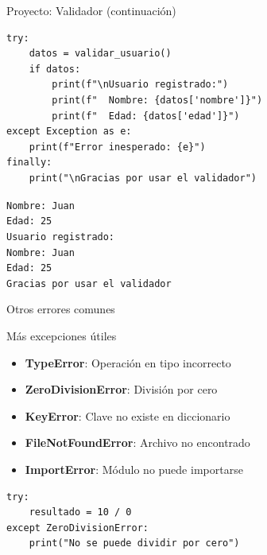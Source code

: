 \documentclass{beamer}
\begin{document}
\begin{frame}[fragile]{Proyecto: Validador (continuación) \faUserCog}
\begin{lstlisting}
try:
    datos = validar_usuario()
    if datos:
        print(f"\nUsuario registrado:")
        print(f"  Nombre: {datos['nombre']}")
        print(f"  Edad: {datos['edad']}")
except Exception as e:
    print(f"Error inesperado: {e}")
finally:
    print("\nGracias por usar el validador")
\end{lstlisting}

\vspace{-0.2cm}
\begin{tcolorbox}[colback=green!10,colframe=green,title={\small\faArrowCircleRight \ Ejemplo de salida},coltitle=fg0,left=3pt,right=3pt,top=2pt,bottom=2pt,boxsep=1pt]
\small\texttt{Nombre: Juan\\
Edad: 25\\
Usuario registrado:\\
  Nombre: Juan\\
  Edad: 25\\
Gracias por usar el validador}
\end{tcolorbox}
\end{frame}

\begin{frame}[fragile]{Otros errores comunes \faList}
\begin{conceptbox}{Más excepciones útiles}
\small
\begin{itemize}
    \item[\faBug] \textbf{TypeError}: Operación en tipo incorrecto
    \item[\faBug] \textbf{ZeroDivisionError}: División por cero
    \item[\faBug] \textbf{KeyError}: Clave no existe en diccionario
    \item[\faBug] \textbf{FileNotFoundError}: Archivo no encontrado
    \item[\faBug] \textbf{ImportError}: Módulo no puede importarse
\end{itemize}
\end{conceptbox}

\vspace{0.2cm}
\begin{lstlisting}
try:
    resultado = 10 / 0
except ZeroDivisionError:
    print("No se puede dividir por cero")
\end{lstlisting}
\end{frame}
\end{document}
